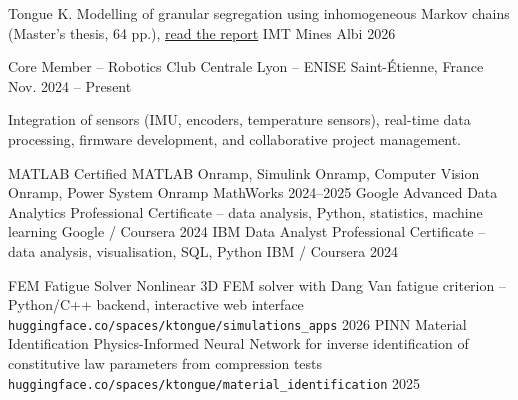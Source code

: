 \documentclass[11pt, a4paper]{awesome-cv}
\begin{document}
\begin{cvhonors}
  \cvhonor
    {Tongue K.}
    {Modelling of granular segregation using inhomogeneous Markov chains (Master's thesis, 64 pp.), \href{https://tiffank1802.github.io/rapports/rapport-stage-dem-mcm.pdf}{\underline{read the report}}}
    {IMT Mines Albi}
    {2026}
\end{cvhonors}


\begin{cventries}

  \cventry
    {Core Member – Robotics Club}
    {Centrale Lyon -- ENISE}
    {Saint-\'Etienne, France}
    {Nov. 2024 -- Present}
    {
      \begin{cvitems}
        \item Integration of sensors (IMU, encoders, temperature sensors), real-time data processing, firmware development, and collaborative project management.
      \end{cvitems}
    }

\end{cventries}

\begin{cvhonors}
  \cvhonor
    {MATLAB Certified}
    {MATLAB Onramp, Simulink Onramp, Computer Vision Onramp, Power System Onramp}
    {MathWorks}
    {2024--2025}
  \cvhonor
    {Google Advanced Data Analytics}
    {Professional Certificate – data analysis, Python, statistics, machine learning}
    {Google / Coursera}
    {2024}
  \cvhonor
    {IBM Data Analyst}
    {Professional Certificate – data analysis, visualisation, SQL, Python}
    {IBM / Coursera}
    {2024}
\end{cvhonors}

\begin{cvhonors}
  \cvhonor
    {FEM Fatigue Solver}
    {Nonlinear 3D FEM solver with Dang Van fatigue criterion – Python/C++ backend, interactive web interface}
    {\texttt{huggingface.co/spaces/ktongue/simulations\_apps}}
    {2026}
  \cvhonor
    {PINN Material Identification}
    {Physics-Informed Neural Network for inverse identification of constitutive law parameters from compression tests}
    {\texttt{huggingface.co/spaces/ktongue/material\_identification}}
    {2025}
\end{cvhonors}
\end{document}
